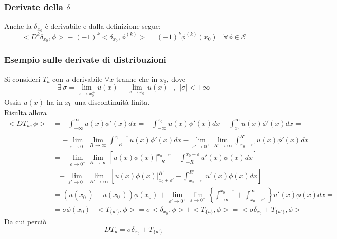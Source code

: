 \documentclass[twoside]{article}
\begin{document}
\subsubsection{Derivate della \texorpdfstring{$\delta$}{Lg}}
Anche la $\delta_{x_{0}}$ è derivabile e dalla definizione segue:
\begin{equation}
    <D^k \delta_{x_{0}},\phi>\equiv (-1)^k <\delta_{x_{0}},\phi^{(k)}>=(-1)^k\phi^{(k)}(x_0) \ \ \ \ \forall \phi \in \mathcal{E}
\end{equation}

\subsubsection{Esempio sulle derivate di distribuzioni}
Si consideri $T_u$ con $u$ derivabile $\forall x$ tranne che in $x_0$, dove
\begin{equation*}
    \exists\ \sigma=\lim_{x\to x_0^+}u(x)-\lim_{x\to x_0^-}u(x) \ \ \ , \ \ |\sigma|<+\infty
\end{equation*}
Ossia $u(x)$ ha in $x_0$ una discontinuità finita.
\\
Risulta allora
\begin{align}
        <DT_u,\phi>&=-\int_{-\infty}^\infty u(x)\phi'(x)dx
        =-\int_{-\infty}^{x_0}u(x)\phi'(x)dx-\int_{x_0}^\infty u(x)\phi'(x)dx  =\\    &=-\lim_{\varepsilon\to0^+}\lim_{R\to\infty} \int_{-R}^{x_0-\varepsilon}u(x)\phi'(x)dx-\lim_{\varepsilon'\to0^+}\lim_{R'\to\infty}\int_{x_0+\varepsilon'}^{R'}u(x)\phi'(x)dx=\\
        &=-\lim_{\varepsilon\to0^+}\lim_{R\to\infty} \left[ u(x)\phi(x)\left. \right|_{-R}^{x_0-\varepsilon}-\int_{-R}^{x_0-\varepsilon}u'(x)\phi(x)dx \right] -\\& \ \ \  -\lim_{\varepsilon'\to0^+}\lim_{R'\to\infty} \left[ u(x)\phi(x)\left. \right|_{x_0+\varepsilon'}^{R'}-\int_{x_0+\varepsilon'}^{R'}u'(x)\phi(x)dx \right]=\\
        &=(u(x_0^+)-u(x_0^-))\phi(x_0)+\lim_{\varepsilon'\to0^+}\lim_{\varepsilon\to0^-}\left\{\int_{-\infty}^{x_0-\varepsilon} +\int_{x_0+\varepsilon'}^{\infty}\right\}u'(x)\phi(x)dx=\\
        &=\sigma\phi(x_0)+<T_{\{u'\}},\phi>=\sigma<\delta_{x_0},\phi>+<T_{\{u\}},\phi>=<\sigma \delta_{x_0}+T_{\{u'\}},\phi>
\end{align}
Da cui perciò
\begin{equation}
    DT_u=\sigma \delta_{x_0}+T_{\{ u'\}}
\end{equation}
\end{document}
